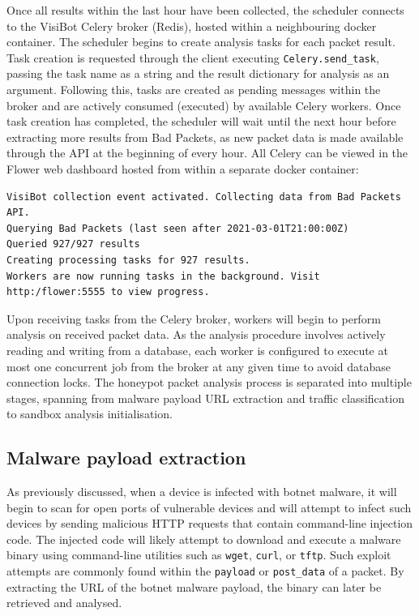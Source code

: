 Once all results within the last hour have been collected, the scheduler connects to the VisiBot Celery broker (Redis), hosted within a neighbouring docker container. The scheduler begins to create analysis tasks for each packet result. Task creation is requested through the client executing \texttt{Celery.send\_task}, passing the task name as a string and the result dictionary for analysis as an argument. Following this, tasks are created as pending messages within the broker and are actively consumed (executed) by available Celery workers. Once task creation has completed, the scheduler will wait until the next hour before extracting more results from Bad Packets, as new packet data is made available through the API at the beginning of every hour. All Celery can be viewed in the Flower web dashboard hosted from within a separate docker container:

\begin{lstlisting}[caption={Example output of VisiBot Processing Scheduler.}]
VisiBot collection event activated. Collecting data from Bad Packets API.
Querying Bad Packets (last seen after 2021-03-01T21:00:00Z)
Queried 927/927 results
Creating processing tasks for 927 results.
Workers are now running tasks in the background. Visit http:/flower:5555 to view progress.
\end{lstlisting}

Upon receiving tasks from the Celery broker, workers will begin to perform analysis on received packet data. As the analysis procedure involves actively reading and writing from a database, each worker is configured to execute at most one concurrent job from the broker at any given time to avoid database connection locks. The honeypot packet analysis process is separated into multiple stages, spanning from malware payload URL extraction and traffic classification to sandbox analysis initialisation. 

\subsection{Malware payload extraction}

As previously discussed, when a device is infected with botnet malware, it will begin to scan for open ports of vulnerable devices and will attempt to infect such devices by sending malicious HTTP requests that contain command-line injection code. The injected code will likely attempt to download and execute a malware binary using command-line utilities such as \texttt{wget}, \texttt{curl}, or \texttt{tftp}. Such exploit attempts are commonly found within the \texttt{payload} or \texttt{post\_data} of a packet. By extracting the URL of the botnet malware payload, the binary can later be retrieved and analysed. 

